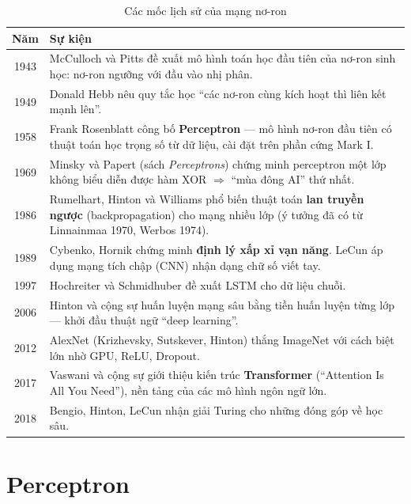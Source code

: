 \begin{table}[H]
\centering
\begin{tabular}{|c|p{11.5cm}|}
\hline
\textbf{Năm} & \textbf{Sự kiện} \\
\hline
1943 & McCulloch và Pitts đề xuất mô hình toán học đầu tiên của nơ-ron sinh học: nơ-ron ngưỡng với đầu vào nhị phân. \\ \hline
1949 & Donald Hebb nêu quy tắc học ``các nơ-ron cùng kích hoạt thì liên kết mạnh lên''. \\ \hline
1958 & Frank Rosenblatt công bố \textbf{Perceptron} --- mô hình nơ-ron đầu tiên có thuật toán học trọng số từ dữ liệu, cài đặt trên phần cứng Mark I. \\ \hline
1969 & Minsky và Papert (sách \textit{Perceptrons}) chứng minh perceptron một lớp không biểu diễn được hàm XOR $\Rightarrow$ ``mùa đông AI'' thứ nhất. \\ \hline
1986 & Rumelhart, Hinton và Williams phổ biến thuật toán \textbf{lan truyền ngược} (backpropagation) cho mạng nhiều lớp (ý tưởng đã có từ Linnainmaa 1970, Werbos 1974). \\ \hline
1989 & Cybenko, Hornik chứng minh \textbf{định lý xấp xỉ vạn năng}. LeCun áp dụng mạng tích chập (CNN) nhận dạng chữ số viết tay. \\ \hline
1997 & Hochreiter và Schmidhuber đề xuất LSTM cho dữ liệu chuỗi. \\ \hline
2006 & Hinton và cộng sự huấn luyện mạng sâu bằng tiền huấn luyện từng lớp --- khởi đầu thuật ngữ ``deep learning''. \\ \hline
2012 & AlexNet (Krizhevsky, Sutskever, Hinton) thắng ImageNet với cách biệt lớn nhờ GPU, ReLU, Dropout. \\ \hline
2017 & Vaswani và cộng sự giới thiệu kiến trúc \textbf{Transformer} (``Attention Is All You Need''), nền tảng của các mô hình ngôn ngữ lớn. \\ \hline
2018 & Bengio, Hinton, LeCun nhận giải Turing cho những đóng góp về học sâu. \\ \hline
\end{tabular}
\caption{Các mốc lịch sử của mạng nơ-ron}
\end{table}

\section{Perceptron}

